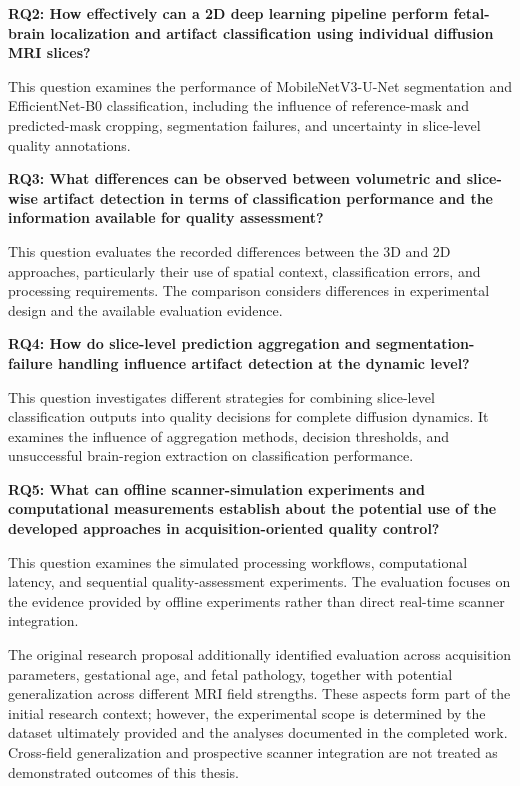 \noindent\textbf{RQ2: How effectively can a 2D deep learning pipeline perform fetal-brain localization and artifact classification using individual diffusion MRI slices?}

This question examines the performance of MobileNetV3-U-Net segmentation and EfficientNet-B0 classification, including the influence of reference-mask and predicted-mask cropping, segmentation failures, and uncertainty in slice-level quality annotations.

\noindent\textbf{RQ3: What differences can be observed between volumetric and slice-wise artifact detection in terms of classification performance and the information available for quality assessment?}

This question evaluates the recorded differences between the 3D and 2D approaches, particularly their use of spatial context, classification errors, and processing requirements. The comparison considers differences in experimental design and the available evaluation evidence.

\noindent\textbf{RQ4: How do slice-level prediction aggregation and segmentation-failure handling influence artifact detection at the dynamic level?}

This question investigates different strategies for combining slice-level classification outputs into quality decisions for complete diffusion dynamics. It examines the influence of aggregation methods, decision thresholds, and unsuccessful brain-region extraction on classification performance.

\noindent\textbf{RQ5: What can offline scanner-simulation experiments and computational measurements establish about the potential use of the developed approaches in acquisition-oriented quality control?}

This question examines the simulated processing workflows, computational latency, and sequential quality-assessment experiments. The evaluation focuses on the evidence provided by offline experiments rather than direct real-time scanner integration.

The original research proposal additionally identified evaluation across acquisition parameters, gestational age, and fetal pathology, together with potential generalization across different MRI field strengths. These aspects form part of the initial research context; however, the experimental scope is determined by the dataset ultimately provided and the analyses documented in the completed work. Cross-field generalization and prospective scanner integration are not treated as demonstrated outcomes of this thesis.

